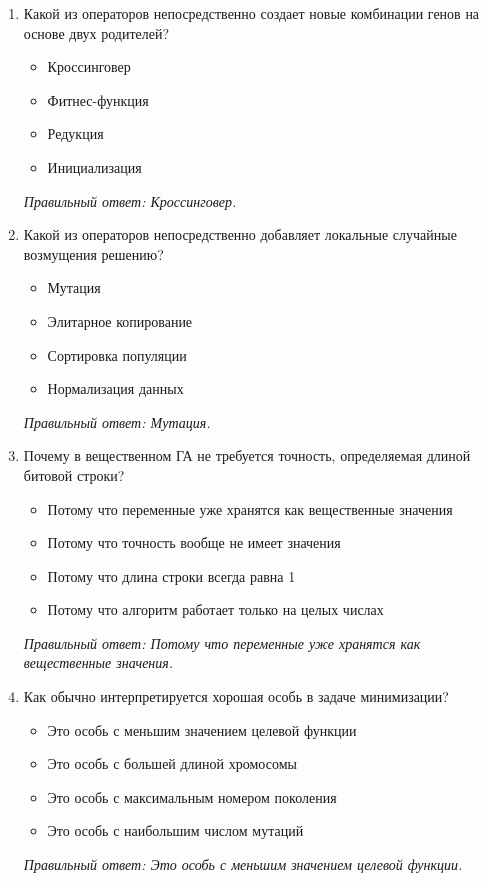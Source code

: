 \begin{enumerate}[label=\textbf{\arabic*.}, leftmargin=0pt, itemsep=1.2em]
\item Какой из операторов непосредственно создает новые комбинации генов на основе двух родителей?
\begin{itemize}[label=$\square$, leftmargin=1.5cm, itemsep=0.2em, topsep=0.3em]
\item Кроссинговер
\item Фитнес-функция
\item Редукция
\item Инициализация
\end{itemize}
{\small\textit{Правильный ответ: Кроссинговер.}}

\item Какой из операторов непосредственно добавляет локальные случайные возмущения решению?
\begin{itemize}[label=$\square$, leftmargin=1.5cm, itemsep=0.2em, topsep=0.3em]
\item Мутация
\item Элитарное копирование
\item Сортировка популяции
\item Нормализация данных
\end{itemize}
{\small\textit{Правильный ответ: Мутация.}}

\item Почему в вещественном ГА не требуется точность, определяемая длиной битовой строки?
\begin{itemize}[label=$\square$, leftmargin=1.5cm, itemsep=0.2em, topsep=0.3em]
\item Потому что переменные уже хранятся как вещественные значения
\item Потому что точность вообще не имеет значения
\item Потому что длина строки всегда равна 1
\item Потому что алгоритм работает только на целых числах
\end{itemize}
{\small\textit{Правильный ответ: Потому что переменные уже хранятся как вещественные значения.}}

\item Как обычно интерпретируется хорошая особь в задаче минимизации?
\begin{itemize}[label=$\square$, leftmargin=1.5cm, itemsep=0.2em, topsep=0.3em]
\item Это особь с меньшим значением целевой функции
\item Это особь с большей длиной хромосомы
\item Это особь с максимальным номером поколения
\item Это особь с наибольшим числом мутаций
\end{itemize}
{\small\textit{Правильный ответ: Это особь с меньшим значением целевой функции.}}


\end{enumerate}
